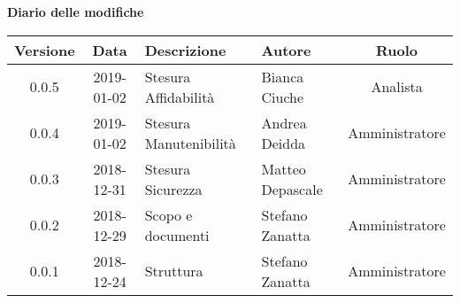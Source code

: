 	\begin{center}
		\textbf{Diario delle modifiche}
	\end{center}
	\begin{center}
		\begin{tabularx}{\textwidth}{|c|c|X|X|c|}
			\hline
			\textbf{Versione} & \textbf{Data} & \textbf{Descrizione} & \textbf{Autore} & \textbf{Ruolo} \\
			\hline
			0.0.5 & 2019-01-02 & Stesura Affidabilità & Bianca Ciuche & Analista\\
			0.0.4 & 2019-01-02 & Stesura Manutenibilità & Andrea Deidda & Amministratore\\
			0.0.3 & 2018-12-31 & Stesura Sicurezza & Matteo Depascale & Amministratore\\
			0.0.2 & 2018-12-29 & Scopo e documenti & Stefano Zanatta & Amministratore\\
			0.0.1 & 2018-12-24 & Struttura & Stefano Zanatta & Amministratore\\
			\hline
		\end{tabularx}
	\end{center}
\newpage